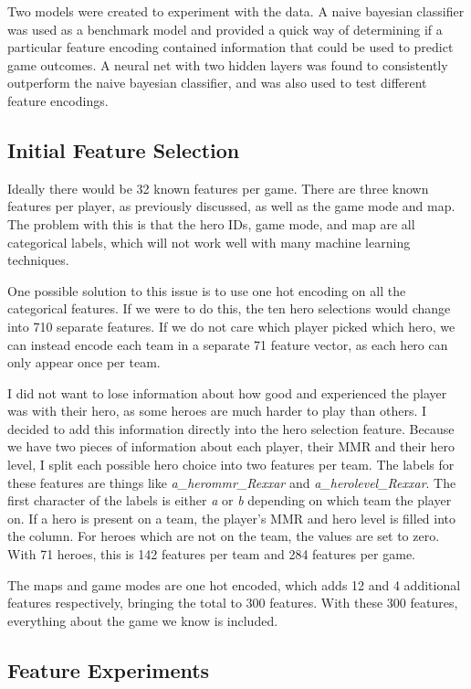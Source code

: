 \documentclass[twoside,twocolumn]{article}
\begin{document}
Two models were created to experiment with the data.  A naive bayesian classifier was used as a benchmark model and provided a quick way of determining if a particular feature encoding contained information that could be used to predict game outcomes.  A neural net with two hidden layers was found to consistently outperform the naive bayesian classifier, and was also used to test different feature encodings.

\subsection{Initial Feature Selection}

Ideally there would be 32 known features per game.  There are three known features per player, as previously discussed, as well as the game mode and map.  The problem with this is that the hero IDs, game mode, and map are all categorical labels, which will not work well with many machine learning techniques.

One possible solution to this issue is to use one hot encoding on all the categorical features.  If we were to do this, the ten hero selections would change into 710 separate features.  If we do not care which player picked which hero, we can instead encode each team in a separate 71 feature vector, as each hero can only appear once per team. 

I did not want to lose information about how good and experienced the player was with their hero, as some heroes are much harder to play than others.  I decided to add this information directly into the hero selection feature.  Because we have two pieces of information about each player, their MMR and their hero level, I split each possible hero choice into two features per team.  The labels for these features are things like \textit{a\_herommr\_Rexxar} and \textit{a\_herolevel\_Rexxar}.  The first character of the labels is either \textit{a} or \textit{b} depending on which team the player on.  If a hero is present on a team, the player's MMR and hero level is filled into the column.  For heroes which are not on the team, the values are set to zero.  With 71 heroes, this is 142 features per team and 284 features per game.

The maps and game modes are one hot encoded, which adds 12 and 4 additional features respectively, bringing the total to 300 features.  With these 300 features, everything about the game we know is included.

\subsection {Feature Experiments}
\end{document}
